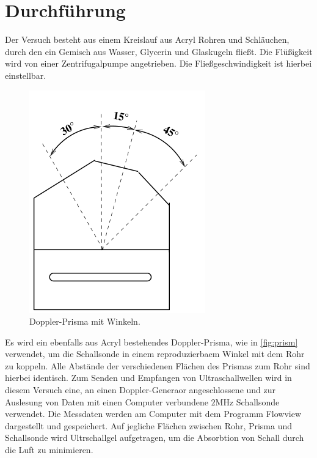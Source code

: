 \section{Durchführung}
\label{sec:Durchführung}

Der Versuch besteht aus einem Kreislauf aus Acryl Rohren und Schläuchen, durch den ein Gemisch aus Wasser, Glycerin und Glaskugeln fließt. Die Flüßigkeit wird von
einer Zentrifugalpumpe angetrieben. Die Fließgeschwindigkeit ist hierbei einstellbar.

\begin{figure}[H]
	\centering
	\includegraphics[width=0.6\linewidth]{data/prisma.png}
	\caption{Doppler-Prisma mit Winkeln.}
	\label{fig:prism}
\end{figure}
\noindent
Es wird ein ebenfalls aus Acryl bestehendes Doppler-Prisma, wie in \autoref{fig:prism} verwendet, um die Schallsonde in einem reproduzierbaem Winkel mit dem Rohr zu koppeln.
Alle Abstände der verschiedenen Flächen des Prismas zum Rohr sind hierbei identisch.
\newline
Zum Senden und Empfangen von Ultraschallwellen wird in diesem Versuch eine, an einen Doppler-Generaor angeschlossene und zur Auslesung von Daten mit einen Computer verbundene
$2\si{\mega\Hz}$ Schallsonde verwendet. Die Messdaten werden am Computer mit dem Programm Flowview dargestellt und gespeichert.
\newline
Auf jegliche Flächen zwischen Rohr, Prisma und Schallsonde wird Ultrschallgel aufgetragen, um die Absorbtion von Schall durch die Luft zu minimieren.
\newline\newline
